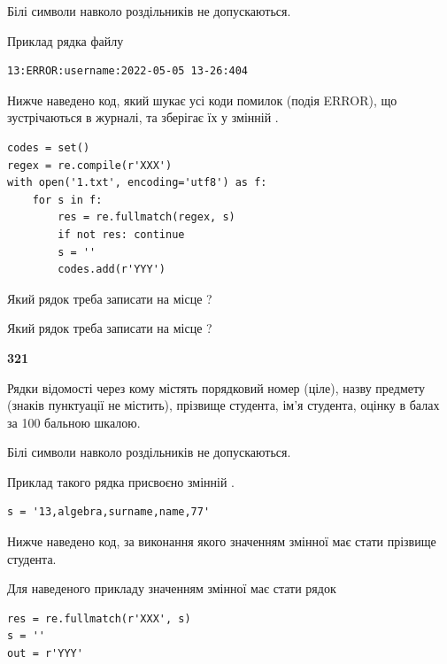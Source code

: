 Білі символи навколо роздільників не допускаються.

Приклад рядка файлу



\begin{verbatim}
13:ERROR:username:2022-05-05 13-26:404
\end{verbatim}


Нижче наведено код, який шукає усі коди помилок (подія ERROR), що зустріча\-ють\-ся в журналі, та зберігає їх у змінній .



\begin{verbatim}
codes = set()
regex = re.compile(r'XXX')
with open('1.txt', encoding='utf8') as f:
    for s in f:
        res = re.fullmatch(regex, s)
        if not res: continue
        s = ''
        codes.add(r'YYY')
\end{verbatim}





Який рядок треба записати на місце  ?\par
\vspace{5mm}


Який рядок треба записати на місце  ?\par


\newpage

{\begin {center}\textbf{ 321}\end {center}}\par
Рядки відомості через кому містять порядковий номер (ціле), назву предмету (зна\-ків пунктуації не містить), прізвище студента, ім'я студента, оцінку в балах за 100 бальною шкалою.

Білі символи навколо роздільників не допускаються.

Приклад такого рядка присвоєно змінній .



\begin{verbatim}
s = '13,algebra,surname,name,77'
\end{verbatim}


Нижче наведено код, за виконання якого значенням змінної  має стати прізвище студента.

Для наведеного прикладу значенням змінної  має стати рядок 



\begin{verbatim}
res = re.fullmatch(r'XXX', s)
s = ''
out = r'YYY'
\end{verbatim}


